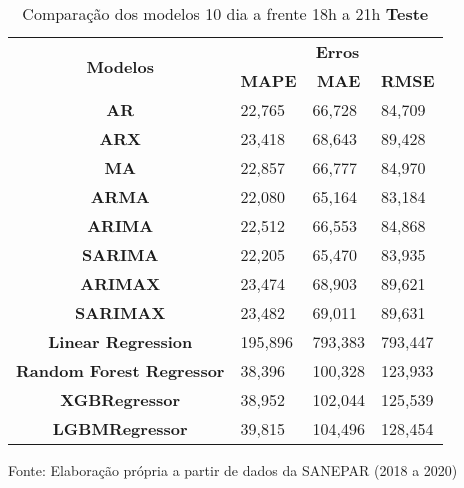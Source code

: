 \begin{table}[H]
	\centering
	\caption{Comparação dos modelos 10 dia a frente 18h a 21h \textbf{Teste} }\label{tb:10-18tst}
	\begin{tabular}{@{}clll@{}}
		\toprule
		\multirow{2}{*}{\textbf{Modelos}} & \multicolumn{3}{c}{\textbf{Erros}}                                                                       \\ \cmidrule(l){2-4} 
		& \multicolumn{1}{c}{\textbf{MAPE}} & \multicolumn{1}{c}{\textbf{MAE}} & \multicolumn{1}{c}{\textbf{RMSE}} \\ \hline
\textbf{AR}                       & 22,765                            & 66,728                           & 84,709                            \\
\textbf{ARX}                      & 23,418                            & 68,643                           & 89,428                            \\
\textbf{MA}                       & 22,857                            & 66,777                           & 84,970                            \\
\textbf{ARMA}                     & 22,080                            & 65,164                           & 83,184                            \\
\textbf{ARIMA}                    & 22,512                            & 66,553                           & 84,868                            \\
\textbf{SARIMA}                   & 22,205                            & 65,470                           & 83,935                            \\
\textbf{ARIMAX}                   & 23,474                            & 68,903                           & 89,621                            \\
\textbf{SARIMAX}                  & 23,482                            & 69,011                           & 89,631                            \\
\textbf{Linear Regression}        & 195,896                           & 793,383                          & 793,447                           \\
\textbf{Random Forest Regressor}  & 38,396                            & 100,328                          & 123,933                           \\
\textbf{XGBRegressor}             & 38,952                            & 102,044                          & 125,539                           \\
\textbf{LGBMRegressor}            & 39,815                            & 104,496                          & 128,454                           \\ \bottomrule
	\end{tabular}

Fonte: Elaboração própria a partir de dados da SANEPAR (2018 a 2020)
\end{table}

